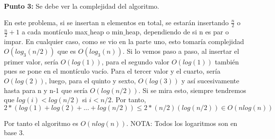 \documentclass[]{report}
\begin{document}
\textbf{Punto 3:} Se debe ver la complejidad del algoritmo. \newline

En este problema, si se insertan n elementos en total, se estarán insertando $\frac{n}{2}$ o $\frac{n}{2}+1$ a cada montículo max$\_$heap o min$\_$heap, dependiendo de si n es par o impar. En cualquier caso, como se vio en la parte uno, esto tomaría complejidad $O(log_{3}(n/2))$ que es $O(log_{3}(n))$. Si lo vemos paso a paso, al insertar el primer valor, sería $O(log(1))$, para el segundo valor $O(log(1))$ también pues se pone en el montículo vacío. Para el tercer valor y el cuarto, sería $O(log(2))$, luego, para el quinto y sexto, $O(log(3))$ y así sucesivamente hasta para n y n-1 que sería $O(log(n/2))$. Si se mira esto, siempre tendremos que $log(i)<log(n/2)$ si $i<n/2$. Por tanto, 
\begin{equation}
2*(log(1)+log(2)+...+log(n/2)) \leq 2*(n/2)(log(n/2)) \in O(nlog(n))
\end{equation}

Por tanto el algoritmo es $O(nlog(n))$. NOTA: Todos los logaritmos son en base 3. 
 
 
\end{document}
